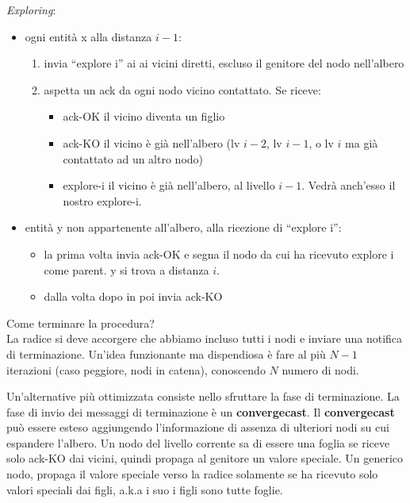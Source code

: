 \textit{Exploring}:
\begin{itemize}
  \item ogni entità x alla distanza $i-1$:
  \begin{enumerate}
    \item invia ``explore i'' ai ai vicini diretti, escluso il genitore del nodo nell'albero
    \item aspetta un ack da ogni nodo vicino contattato. Se riceve:
    \begin{itemize}
      \item ack-OK il vicino diventa un figlio
      \item ack-KO il vicino è già nell'albero (lv $i-2$, lv $i-1$, o lv $i$ ma già contattato ad un altro nodo)
      \item explore-i il vicino è già nell'albero, al livello $i-1$. Vedrà anch'esso il nostro explore-i.
    \end{itemize}
  \end{enumerate}
  \item entità y non appartenente all'albero, alla ricezione di ``explore i'':
  \begin{itemize}
    \item la prima volta invia ack-OK e segna il nodo da cui ha ricevuto explore i come parent. y si trova a distanza $i$.
    \item dalla volta dopo in poi invia ack-KO
  \end{itemize}
\end{itemize}
    
Come terminare la procedura?\\
La radice si deve accorgere che abbiamo incluso tutti i nodi e inviare una notifica di terminazione.
Un'idea funzionante ma dispendiosa è fare al più $N-1$ iterazioni (caso peggiore, nodi in catena), conoscendo $N$ numero di nodi.

Un'alternative più ottimizzata consiste nello sfruttare la fase di terminazione.
La fase di invio dei messaggi di terminazione è un \textbf{convergecast}. Il \textbf{convergecast} può essere esteso aggiungendo l'informazione
di assenza di ulteriori nodi su cui espandere l'albero.
Un nodo del livello corrente sa di essere una foglia se riceve solo ack-KO dai vicini, quindi propaga al genitore un valore speciale.
Un generico nodo, propaga il valore speciale verso la radice solamente se ha ricevuto solo valori speciali dai figli, a.k.a i suo i figli sono
tutte foglie.

